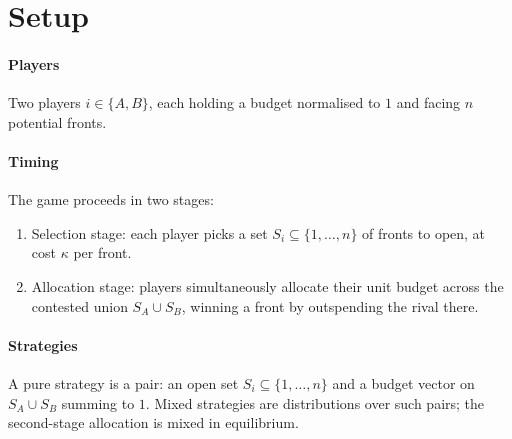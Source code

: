 \documentclass[10pt,a4paper]{article}
\title{\prototitle}
\date{\protodate}
\begin{document}
\makeprotocover

\begin{abstract}
\noindent We study Colonel Blotto with an \emph{endogenous} battlefield stage:
each player first selects a subset of fronts to open, then allocates a fixed
budget across the union of opened fronts. The selection stage is shown to
concentrate effort, which sparsifies the support of any equilibrium allocation
and lets us characterise the resulting mixed equilibrium in closed form. This is
a forge prototype: every result carries a coloured status disc, an intuition
line, a footnote-sized proof sketch, and a forward dependency pointer. Proof
sketches sit in the appendix; the dependency-flow skeleton closes the document.
\end{abstract}

\section{Setup}\label{sec:setup}

\paragraph{Players} \noindent Two players $i\in\{A,B\}$, each holding a budget
normalised to $1$ and facing $n$ potential fronts.

\paragraph{Timing} \noindent The game proceeds in two stages:
\begin{enumerate}\setlength{\itemsep}{1pt}
  \item Selection stage: each player picks a set $S_i\subseteq\{1,\dots,n\}$ of
        fronts to open, at cost $\kappa$ per front.
  \item Allocation stage: players simultaneously allocate their unit budget
        across the contested union $S_A\cup S_B$, winning a front by outspending
        the rival there.
\end{enumerate}

\paragraph{Strategies} \noindent A pure strategy is a pair: an open set
$S_i\subseteq\{1,\dots,n\}$ and a budget vector on $S_A\cup S_B$ summing to $1$.
Mixed strategies are distributions over such pairs; the second-stage allocation
is mixed in equilibrium.
\end{document}
